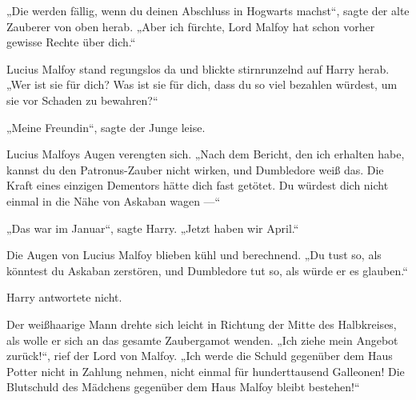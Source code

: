 „Die werden fällig, wenn du deinen Abschluss in Hogwarts machst“, sagte der alte Zauberer von oben herab.
„Aber ich fürchte, Lord Malfoy hat schon vorher gewisse Rechte über dich.“

Lucius Malfoy stand regungslos da und blickte stirnrunzelnd auf Harry herab.
„Wer ist sie für dich? Was ist sie für dich, dass du so viel bezahlen würdest, um sie vor Schaden zu bewahren?“

„Meine Freundin“, sagte der Junge leise.

Lucius Malfoys Augen verengten sich.
„Nach dem Bericht, den ich erhalten habe, kannst du den Patronus-Zauber nicht wirken, und Dumbledore weiß das. Die Kraft eines einzigen Dementors hätte dich fast getötet. Du würdest dich nicht einmal in die Nähe von Askaban wagen —“

„Das war im Januar“, sagte Harry.
„Jetzt haben wir April.“

Die Augen von Lucius Malfoy blieben kühl und berechnend.
„Du tust so, als könntest du Askaban zerstören, und Dumbledore tut so, als würde er es glauben.“

Harry antwortete nicht.

Der weißhaarige Mann drehte sich leicht in Richtung der Mitte des Halbkreises, als wolle er sich an das gesamte Zaubergamot wenden.
„Ich ziehe mein Angebot zurück!“, rief der Lord von Malfoy.
„Ich werde die Schuld gegenüber dem Haus Potter nicht in Zahlung nehmen, nicht einmal für hunderttausend Galleonen! Die Blutschuld des Mädchens gegenüber dem Haus Malfoy bleibt bestehen!“

